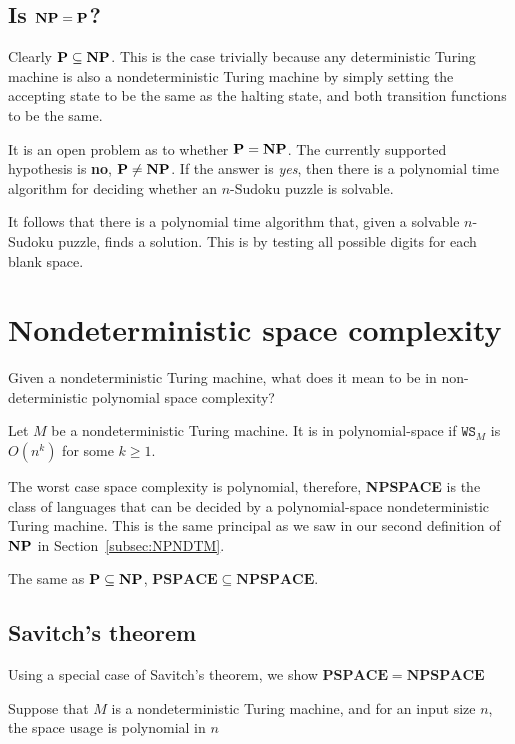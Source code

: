 \documentclass{article}
\begin{document}
\subsection{Is $\bf{NP} = P$?}

Clearly $\bf{P} \subseteq \bf{NP}$. This is the case trivially because any deterministic Turing machine is also a nondeterministic Turing machine by simply setting the accepting state to be the same as the halting state, and both transition functions to be the same.

It is an open problem as to whether $\bf{P} = \bf{NP}$. The currently supported hypothesis is \textbf{no}, $\bf{P} \neq \bf{NP}$. If the answer is \textit{yes}, then there is a polynomial time algorithm for deciding whether an $n$-Sudoku puzzle is solvable.

It follows that there is a polynomial time algorithm that, given a solvable $n$-Sudoku puzzle, finds a solution. This is by testing all possible digits for each blank space.


\section{Nondeterministic space complexity}

Given a nondeterministic Turing machine, what does it mean to be in non-deterministic polynomial space complexity?

Let $M$ be a nondeterministic Turing machine. It is in polynomial-space if $\texttt{WS}_{M}$ is $O(n^{k})$ for some $k \geq 1$.

The worst case space complexity is polynomial, therefore, \textbf{NPSPACE} is the class of languages that can be decided by a polynomial-space nondeterministic Turing machine. This is the same principal as we saw in our second definition of $\bf{NP}$ in Section~\ref{subsec:NPNDTM}.

The same as $\bf{P} \subseteq \bf{NP}$, $\mathbf{PSPACE} \subseteq \mathbf{NPSPACE}  $.

\subsection{Savitch's theorem}

Using a special case of Savitch's theorem, we show $\mathbf{PSPACE} = \mathbf{NPSPACE}  $

Suppose that $M$ is a nondeterministic Turing machine, and for an input size $n$, the space usage is polynomial in $n$
\end{document}
